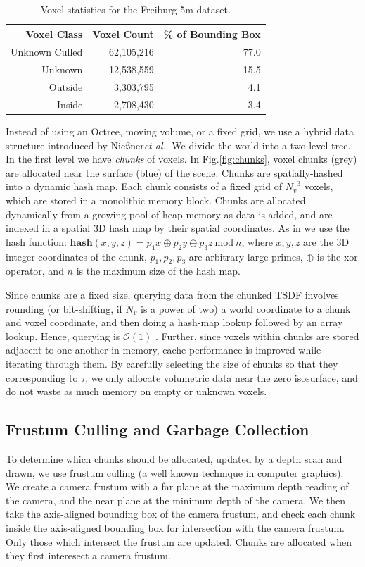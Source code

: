 \documentclass[conference]{IEEEtran}
\newcommand{\figref}[1]{Fig.\ref{#1}}
\newcommand{\etal}{\textit{et al.}\xspace}
\newcommand{\TSDF}{TSDF\xspace}
\newcommand{\Niessner}{Nie{\ss}ner\xspace}
\begin{document}
\begin{table}[t!]
\centering
	\begin{tabular} {rrr}
	\toprule
	Voxel Class & Voxel Count & \% of Bounding Box \\ 
	\midrule
	Unknown Culled & 62,105,216 & 77.0 \\ 
	Unknown & 12,538,559 & 15.5 \\ 
	Outside & 3,303,795 & 4.1 \\ 
	Inside & 2,708,430 & 3.4 \\ 
	\bottomrule
	\end{tabular}
	\caption{Voxel statistics for the Freiburg 5m dataset.}
	\label{table:volumecount}  
\end{table}

Instead of using an Octree, moving volume, or a fixed grid, we use a hybrid data
structure introduced by \Niessner \etal \cite{NiessnerHashing}. We divide
the world into a two-level tree. In the first level we have \emph{chunks} of
voxels.  In \figref{fig:chunks}, voxel chunks (grey) are allocated near the
surface (blue) of the scene. Chunks are spatially-hashed \cite{SpatialHashing}
into a dynamic hash map.  Each chunk consists of a fixed grid of ${N_v}^3$
voxels, which are stored in a monolithic memory block. Chunks are allocated
dynamically from a growing pool of heap memory as data is added, and are
indexed in a spatial 3D hash map \cite{SpatialHashing} by their spatial
coordinates. As in \cite{SpatialHashing, NiessnerHashing} we use the hash
function:  $ \textbf{hash}(x, y, z) = p_1 x\oplus p_2 y \oplus p_3 z
~\text{mod}~n $, where $x, y, z$ are the 3D integer coordinates of the chunk,
$p_1, p_2, p_3$ are arbitrary large primes, $\oplus$ is the xor operator, and $n$ is
the maximum size of the hash map.

Since chunks are a fixed size, querying data from the chunked \TSDF involves
rounding (or bit-shifting, if $N_v$ is a power of two) a world coordinate to a
chunk and voxel coordinate, and then doing a hash-map lookup followed by an
array lookup. Hence, querying is $\mathcal{O}(1)$ \cite{NiessnerHashing}.
Further, since voxels within chunks are stored adjacent to one another in
memory, cache performance is improved while iterating through them. By carefully
selecting the size of chunks so that they corresponding to $\tau$, we only
allocate volumetric data near the zero isosurface, and do not waste as much
memory on empty or unknown voxels.

\subsection{Frustum Culling and Garbage Collection}
\label{section:frustum}
To determine which chunks should be allocated, updated by a depth scan and
drawn, we use frustum culling (a well known technique in computer graphics). We 
create a camera frustum with a far plane at the maximum depth reading of the camera, and
the near plane at the minimum depth of the camera. We then take the 
axis-aligned bounding box of the camera frustum, and check each chunk inside the
axis-aligned bounding box for intersection with the camera frustum. Only those
which intersect the frustum are updated. Chunks are allocated when they first
interesect a camera frustum.
\end{document}
